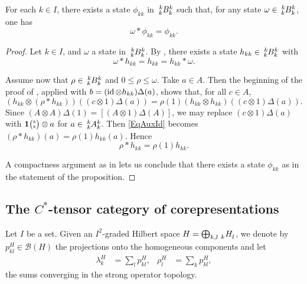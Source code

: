 \begin{Prop} For each $k\in I$, there exists a state $\phi_{kk}$ in $\Gr{B}{k}{k}{k}{k}$ such that, for any state $\omega \in \Gr{B}{k}{k}{k}{k}$, one has \[\omega*\phi_{kk} =\phi_{kk}.\]
\end{Prop} 
\begin{proof} Let $k\in I$, and $\omega$ a state in $\Gr{B}{k}{k}{k}{k}$. By \cite[Lemma 4.2]{MVD1},
  there exists a state $h_{kk} \in \Gr{B}{k}{k}{k}{k}$ with \[\omega *h_{kk}= h_{kk} =
  h_{kk}*\omega.\]

  Assume now that $\rho\in \Gr{B}{k}{k}{k}{k}$ and $0\leq \rho\leq \omega$. Take $a\in A$. Then the
  beginning of the proof of \cite[Lemma 4.3]{MVD1}, applied with $b= (\operatorname{id}\otimes h_{kk})\Delta(a)$,
  shows that, for all $c\in A$, 
  \begin{equation}\label{EqAuxId} (h_{kk}\otimes
    (\rho*h_{kk}))((c\otimes 1)\Delta(a)) = \rho(1) (h_{kk}\otimes h_{kk})((c\otimes
    1)\Delta(a)).\end{equation} 
Since $(A\otimes A)\Delta(1) = [(A\otimes 1)\Delta(A)]$, we may
  replace $(c\otimes 1)\Delta(a)$ with $\mathbf{1}{\tiny {\begin{pmatrix} k\\k\end{pmatrix}}}\otimes a$ for $a\in \Gr{A}{k}{k}{k}{k}$. Then
  \eqref{EqAuxId} becomes $(\rho*h_{kk})(a) = \rho(1)h_{kk}(a)$. Hence \[\rho*h_{kk} =
  \rho(1)h_{kk}.\]

A compactness argument as in \cite[Theorem 4.4]{MVD1} lets us conclude that there exists a state $\phi_{kk}$ as in the statement of the proposition.
\end{proof}





\subsection{The $C^{*}$-tensor category of corepresentations}

Let $I$ be a set. Given an $I^{2}$-graded Hilbert space
$H=\bigoplus_{k,l} \Grd{H}{k}{l}$, we denote by
$p_{kl}^{H} \in \mathcal{B}(H)$ the projections onto the homogeneous components and let
\begin{align*}
  \lambda^{H}_{k} &= \sum_{l} p_{kl}^{H}, &
  \rho^{H}_{l} &= \sum_{k} p_{kl}^{H},
\end{align*}
 the sums converging in the strong operator topology.


